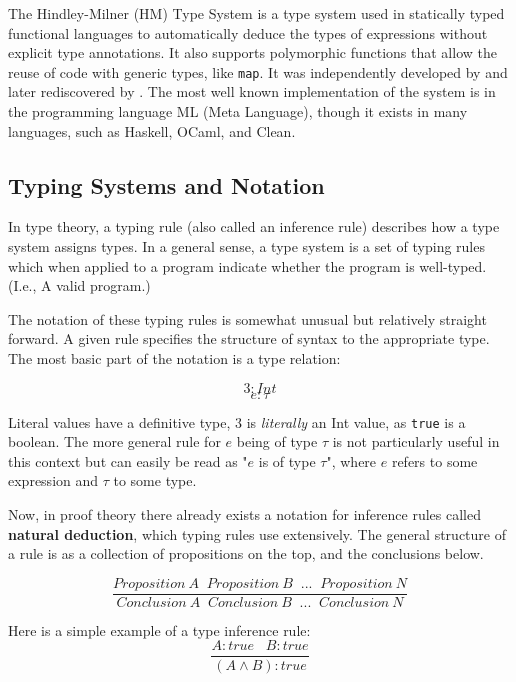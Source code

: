 \documentclass{l4proj}
\begin{document}
The Hindley-Milner (HM) Type System is a type system used in statically typed functional languages to automatically deduce the types of expressions without explicit type annotations.
It also supports polymorphic functions  that allow the reuse of code with generic types, like \texttt{map}.
It was independently developed by \citet{Hindley_1969} and later rediscovered by \citet{Milner_1978}.
The most well known implementation of the system is in the programming language ML (Meta Language), though it exists in many languages, such as Haskell, OCaml, and Clean.

\subsection{Typing Systems and Notation} \label{subsec:typing-systems-and-notation}

In type theory, a typing rule (also called an inference rule) describes how a type system assigns types.
In a general sense, a type system is a set of typing rules which when applied to a program indicate whether the program is well-typed. (I.e., A valid program.)

The notation of these typing rules is somewhat unusual but relatively straight forward.
A given rule specifies the structure of syntax to the appropriate type.
The most basic part of the notation is a type relation:

\[3 : Int\]
\[e : \tau\]

Literal values have a definitive type, $3$ is \emph{literally} an Int value, as \texttt{true} is a boolean.
The more general rule for $e$ being of type $\tau$ is not particularly useful in this context but can easily be read as "$e$ is of type $\tau$", where $e$ refers to some expression and $\tau$ to some type.

Now, in proof theory there already exists a notation for inference rules called \textbf{natural deduction}\citep{Orman_1982}, which typing rules use extensively.
The general structure of a rule is as a collection of propositions on the top, and the conclusions below.

\begin{equation} \label{eq:inference-syntax-example}
\frac{Proposition\: A \;\; Proposition\: B \;\; ... \;\; Proposition\: N}{Conclusion\: A \;\; Conclusion\: B \;\; ... \;\; Conclusion\: N}
\end{equation}

Here is a simple example of a type inference rule:
\begin{equation} \label{eq:inference-example}
\frac{A : true \;\;\; B : true}{(A \wedge B) : true}
\end{equation}
\end{document}
